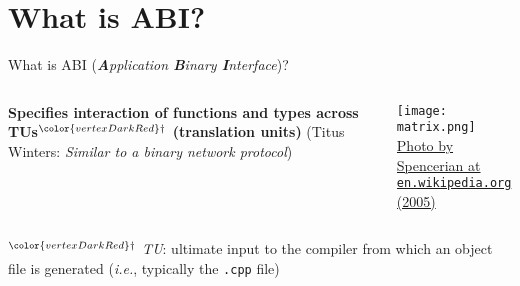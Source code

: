 \section{What is ABI?}

\begin{frame}
    \centering
    \scalebox{3}{What is ABI?}
\end{frame}

\begin{frame}{What is ABI (\textit{\textbf{A}pplication \textbf{B}inary \textbf{I}nterface})?}
    \begin{columns}
        \begin{column}{.6\textwidth}
            \textbf{Specifies interaction of functions and types across TUs${}^{\color{vertexDarkRed}\dagger}$ (translation units)}
            (Titus Winters: \textit{Similar to a binary network protocol})
        \end{column}
        \begin{column}{.3\textwidth}
            \centering
            \texttt{[image: matrix.png]}\\
            {\footnotesize \href{https://commons.wikimedia.org/wiki/File:Spencerian_Matrix_cosplay.jpg}{Photo by Spencerian at \texttt{en.wikipedia.org} (2005)}}
        \end{column}
    \end{columns}

    \vspace{5mm}

    \footnotesize ${}^{\color{vertexDarkRed}\dagger}$ \textit{TU}: ultimate input to the compiler from which an object file is generated (\textit{i.e.}, typically the \texttt{.cpp} file)
\end{frame}

